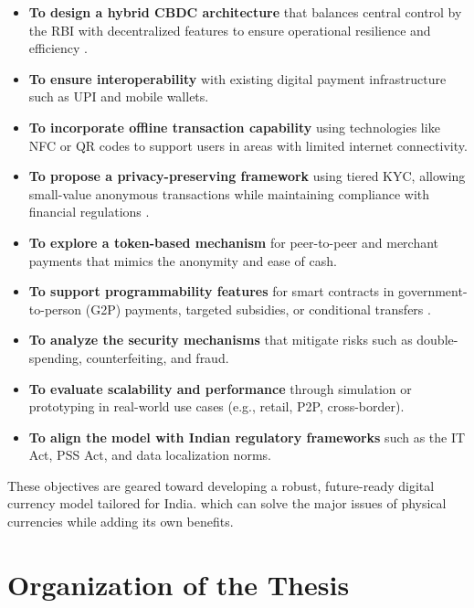 \begin{itemize}
    \item \textbf{To design a hybrid CBDC architecture} that balances central control by the RBI with decentralized features to ensure operational resilience and efficiency \cite{boar2021}.

    \item \textbf{To ensure interoperability} with existing digital payment infrastructure such as UPI and  mobile wallets.

    \item \textbf{To incorporate offline transaction capability} using technologies like NFC or QR codes to support users in areas with limited internet connectivity.

    \item \textbf{To propose a privacy-preserving framework} using tiered KYC, allowing small-value anonymous transactions while maintaining compliance with financial regulations \cite{auer2020, bains2022} .

    \item \textbf{To explore a token-based mechanism} for peer-to-peer and merchant payments that mimics the anonymity and ease of cash.

    \item \textbf{To support programmability features} for smart contracts in government-to-person (G2P) payments, targeted subsidies, or conditional transfers \cite{mengle2018, catalini2021}. 

    \item \textbf{To analyze the security mechanisms} that mitigate risks such as double-spending, counterfeiting, and fraud.

    \item \textbf{To evaluate scalability and performance} through simulation or prototyping in real-world use cases (e.g., retail, P2P, cross-border).

    \item \textbf{To align the model with Indian regulatory frameworks} such as the IT Act, PSS Act, and data localization norms.
\end{itemize}

These objectives are geared toward developing a robust, future-ready digital currency model tailored for India. which can solve the major issues of physical currencies while adding its own benefits.


\section{Organization of the Thesis}
\label{chp1.organization}


